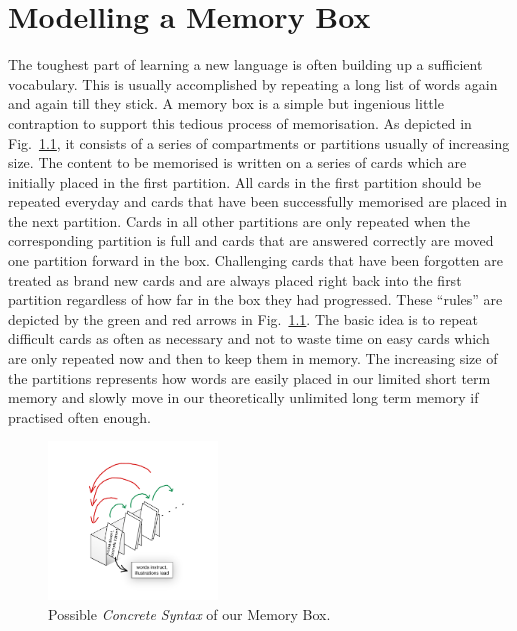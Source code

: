 \chapter{Modelling a Memory Box}
\label{chap:membox}

 The toughest part of learning a new language  is often building up a sufficient
vocabulary.  This is usually accomplished by repeating a long list of words
again and again till they stick.  A memory box is a simple but ingenious little
contraption to support this tedious process of memorisation.  As depicted in
Fig.~\ref{fig:membox_illustration}, it consists of a series of compartments or
partitions usually of increasing size.  The content to be memorised is written
on a series of cards  which are initially placed in the first partition.  All
cards in the first  partition should be repeated everyday and cards that have
been successfully  memorised are placed in the next partition.  Cards in all
other partitions are  only repeated when the corresponding partition is full and
cards that are  answered correctly are moved one partition forward in the box. 
Challenging  cards that have been forgotten are treated as brand new cards and
are always  placed right back into the first partition regardless of how far in
the box they  had progressed.  These ``rules'' are depicted by the green and red
arrows in  Fig.~\ref{fig:membox_illustration}. The basic idea is to repeat
difficult cards as often as necessary  and not to waste time on easy cards which
are only repeated now and then to keep them in memory.  The  increasing size of
the partitions represents how words are easily placed in our limited short term
memory and slowly move in our theoretically unlimited long term memory if
practised often enough.

\begin{figure}[htp]
\begin{center}
  \includegraphics[width=0.4\textwidth]{pics/membox_illustration}
  \caption[]{Possible \emph{Concrete Syntax} of our Memory Box.}
  \label{fig:membox_illustration}
\end{center}
\end{figure}

